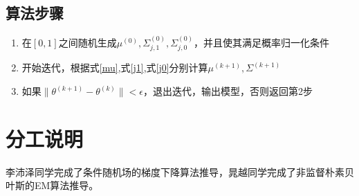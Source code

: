 \documentclass[a4paper,oneside,12pt]{article}
\begin{document}
\begin{spacing}{1.5}
\subsection{算法步骤}
\begin{enumerate}
  \item 在$[0,1]$之间随机生成$\mu^{(0)},\Sigma_{j,1}^{(0)},\Sigma_{j,0}^{(0)}$，并且使其满足概率归一化条件
  \item 开始迭代，根据式\ref{mu},式\ref{j1},式\ref{j0}分别计算$\mu^{(k+1)},\Sigma^{(k+1)}$
  \item 如果$\|\theta^{(k+1)}-\theta^{(k)} \|<\epsilon$，退出迭代，输出模型，否则返回第2步
\end{enumerate}
\section*{分工说明}
李沛泽同学完成了条件随机场的梯度下降算法推导，晁越同学完成了非监督朴素贝叶斯的EM算法推导。
\end{spacing}
\end{document}

